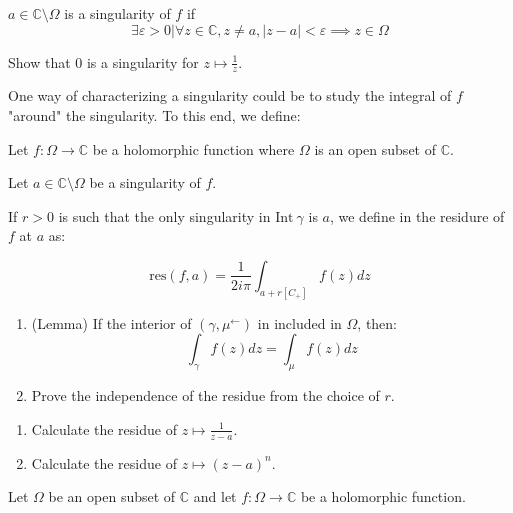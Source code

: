 \begin{enumerate}
\begin{defi}[Singularity]
    $a\in\mathbb{C}\setminus\Omega$ is a singularity of $f$ if
    $$ \exists \varepsilon > 0 \vert \forall z\in\mathbb{C}, z \neq a, |z-a| < \varepsilon \implies z\in\Omega$$
    
\end{defi}
\begin{example}[$\star$]
    Show that $0$ is a singularity for $z \mapsto \frac{1}{z}$.
\end{example}

One way of characterizing a singularity could be to study the integral of $f$ "around" the singularity. To this end, we define:

\begin{defi}
    Let $f: \Omega \rightarrow \mathbb{C}$ be a holomorphic function where $\Omega$ is an open subset of $\mathbb{C}$.

    Let $a\in\mathbb{C}\setminus\Omega$ be a singularity of $f$.

    If $r>0$ is such that the only singularity in $\mathrm{Int}~\gamma$ is $a$, we define in the residure of $f$ at $a$ as:

    $$\mathrm{res}(f, a) = \frac{1}{2i\pi} \int_{a + r[C_+]} f(z)dz$$
\end{defi}

\begin{exo}[$\star$]
    \begin{enumerate}
        \item (Lemma) If the interior of $(\gamma, \mu^\leftarrow)$ in included in $\Omega$, then:
            $$\int_\gamma f(z)dz = \int_\mu f(z)dz$$
        \item Prove the independence of the residue from the choice of $r$.
    \end{enumerate}
\end{exo}

\begin{exo}[$\star$]
    \begin{enumerate}
        \item Calculate the residue of $z \mapsto \frac{1}{z-a}$.
        \item Calculate the residue of $z \mapsto (z-a)^n$.
    \end{enumerate}
\end{exo}

\begin{thm*}
    Let $\Omega$ be an open subset of $\mathbb{C}$ and let $f: \Omega \rightarrow \mathbb{C}$ be a holomorphic function.


\end{thm*}
\end{enumerate}
